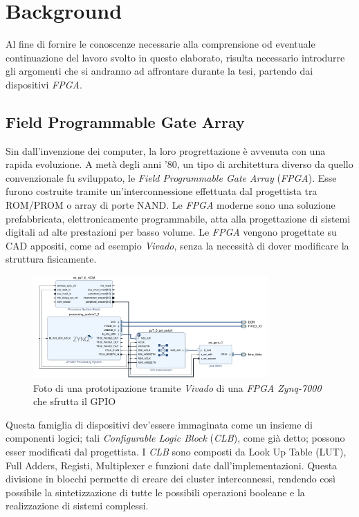 \chapter{Background}
\label{chap:background}
Al fine di fornire le conoscenze necessarie alla comprensione od eventuale continuazione del lavoro svolto in questo elaborato, risulta necessario introdurre gli argomenti che si andranno ad affrontare durante la tesi, partendo dai dispositivi \textit{FPGA}.
\section{Field Programmable Gate Array}
\label{FPGA}
Sin dall'invenzione dei computer, la loro progrettazione è avvenuta con una rapida evoluzione. A metà degli anni '80, un tipo di architettura diverso da quello convenzionale fu sviluppato, le \textit{Field Programmable Gate Array} (\textit{FPGA}). Esse furono costruite tramite un'interconnessione effettuata dal progettista tra ROM/PROM o array di porte NAND.
Le \textit{FPGA} moderne sono una soluzione prefabbricata, elettronicamente programmabile, atta alla progettazione di sistemi digitali ad alte prestazioni per basso volume. Le \textit{FPGA} vengono progettate su CAD appositi, come ad esempio \textit{Vivado}, senza la necessità di dover modificare la struttura fisicamente.\clearpage
\begin{figure}[h]
\centering
\includegraphics[width=0.8\textwidth]{images/Vivado.jpg}
\caption{Foto di una prototipazione tramite \textit{Vivado} di una \textit{FPGA Zynq-7000} che sfrutta il GPIO}
\label{VIVADO1}
\end{figure}
Questa famiglia di dispositivi dev'essere immaginata come un insieme di componenti logici; tali \textit{Configurable Logic Block} (\textit{CLB}), come già detto; possono esser modificati dal progettista. I \textit{CLB} sono composti da Look Up Table (LUT), Full Adders, Registi, Multiplexer e funzioni date dall'implementazioni.
Questa divisione in blocchi permette di creare dei cluster interconnessi, rendendo così possibile la sintetizzazione di tutte le possibili operazioni booleane e la realizzazione di sistemi complessi. 
